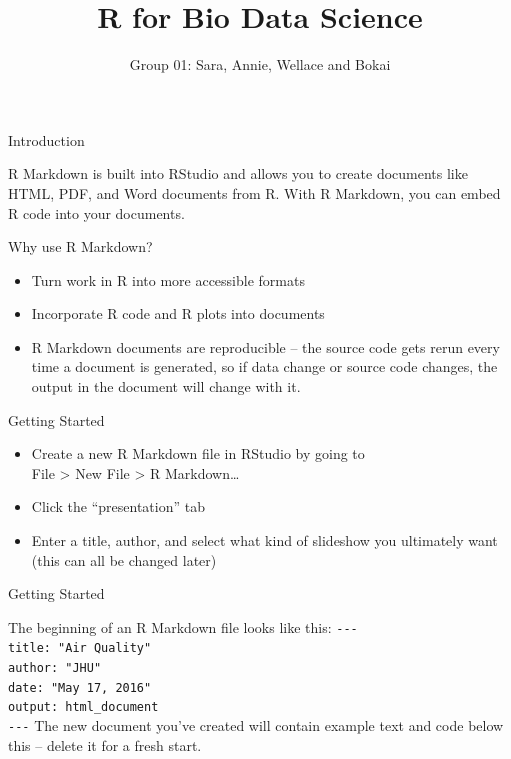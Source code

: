 \documentclass[
  ignorenonframetext,
]{beamer}
\title{R for Bio Data Science}
\author{Group 01: Sara, Annie, Wellace and Bokai}
\date{}
\providecommand{\tightlist}{%
  \setlength{\itemsep}{0pt}\setlength{\parskip}{0pt}}
\begin{document}
\frame{\titlepage}

\begin{frame}{Introduction}
\protect\hypertarget{introduction}{}

R Markdown is built into RStudio and allows you to create documents like
HTML, PDF, and Word documents from R. With R Markdown, you can embed R
code into your documents.

\begin{block}{Why use R Markdown?}

\begin{itemize}
\tightlist
\item
  Turn work in R into more accessible formats
\item
  Incorporate R code and R plots into documents
\item
  R Markdown documents are reproducible -- the source code gets rerun
  every time a document is generated, so if data change or source code
  changes, the output in the document will change with it.
\end{itemize}

\end{block}

\end{frame}

\begin{frame}{Getting Started}
\protect\hypertarget{getting-started}{}

\begin{itemize}
\tightlist
\item
  Create a new R Markdown file in RStudio by going to\\
  File \textgreater{} New File \textgreater{} R Markdown\ldots{}
\item
  Click the ``presentation'' tab
\item
  Enter a title, author, and select what kind of slideshow you
  ultimately want (this can all be changed later)
\end{itemize}

\end{frame}

\begin{frame}[fragile]{Getting Started}
\protect\hypertarget{getting-started-1}{}

The beginning of an R Markdown file looks like this: \texttt{-\/-\/-}\\
\texttt{title:\ "Air\ Quality"}~\\
\texttt{author:\ "JHU"}~\\
\texttt{date:\ "May\ 17,\ 2016"}~\\
\texttt{output:\ html\_document}~\\
\texttt{-\/-\/-} The new document you've created will contain example
text and code below this -- delete it for a fresh start.

\end{frame}
\end{document}
